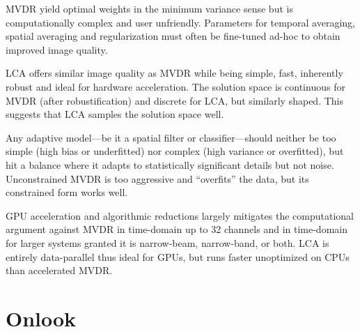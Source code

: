MVDR yield optimal weights in the minimum variance sense but is computationally complex and user unfriendly. Parameters for temporal averaging, spatial averaging and regularization must often be fine-tuned ad-hoc to obtain improved image quality.

LCA offers similar image quality as MVDR while being simple, fast, inherently robust and ideal for hardware acceleration. The solution space is continuous for MVDR (after robustification) and discrete for LCA, but similarly shaped. This suggests that LCA samples the solution space well.

Any adaptive model---be it a spatial filter or classifier---should neither be too simple (high bias or underfitted) nor complex (high variance or overfitted), but hit a balance where it adapts to statistically significant details but not noise. Unconstrained MVDR is too aggressive and ``overfits'' the data, but its constrained form works well.




%

GPU acceleration and algorithmic reductions largely mitigates the computational argument against MVDR in time-domain up to 32 channels and in time-domain for larger systems granted it is narrow-beam, narrow-band, or both. LCA is entirely data-parallel thus ideal for GPUs, but runs faster unoptimized on CPUs than accelerated MVDR.%

%




\section{Onlook}


